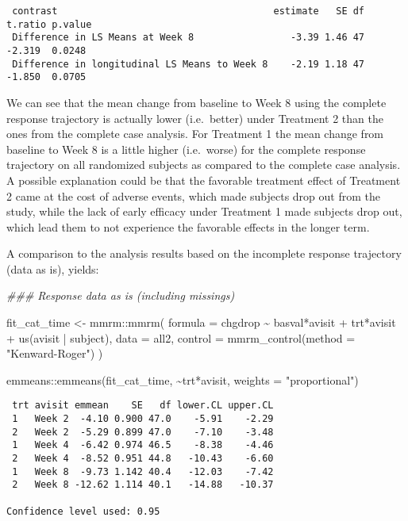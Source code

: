 \documentclass[
  letterpaper,
  DIV=11,
  numbers=noendperiod]{scrreprt}
\newenvironment{Shaded}{\begin{snugshade}}{\end{snugshade}}
\newcommand{\AttributeTok}[1]{\textcolor[rgb]{0.40,0.45,0.13}{#1}}
\newcommand{\DocumentationTok}[1]{\textcolor[rgb]{0.37,0.37,0.37}{\textit{#1}}}
\newcommand{\FunctionTok}[1]{\textcolor[rgb]{0.28,0.35,0.67}{#1}}
\newcommand{\NormalTok}[1]{\textcolor[rgb]{0.00,0.23,0.31}{#1}}
\newcommand{\OtherTok}[1]{\textcolor[rgb]{0.00,0.23,0.31}{#1}}
\newcommand{\SpecialCharTok}[1]{\textcolor[rgb]{0.37,0.37,0.37}{#1}}
\newcommand{\StringTok}[1]{\textcolor[rgb]{0.13,0.47,0.30}{#1}}
\begin{document}
\begin{verbatim}
 contrast                                      estimate   SE df t.ratio p.value
 Difference in LS Means at Week 8                 -3.39 1.46 47  -2.319  0.0248
 Difference in longitudinal LS Means to Week 8    -2.19 1.18 47  -1.850  0.0705
\end{verbatim}

We can see that the mean change from baseline to Week 8 using the
complete response trajectory is actually lower (i.e.~better) under
Treatment 2 than the ones from the complete case analysis. For Treatment
1 the mean change from baseline to Week 8 is a little higher
(i.e.~worse) for the complete response trajectory on all randomized
subjects as compared to the complete case analysis. A possible
explanation could be that the favorable treatment effect of Treatment 2
came at the cost of adverse events, which made subjects drop out from
the study, while the lack of early efficacy under Treatment 1 made
subjects drop out, which lead them to not experience the favorable
effects in the longer term.

A comparison to the analysis results based on the incomplete response
trajectory (data as is), yields:

\begin{Shaded}
\begin{Highlighting}[]
\DocumentationTok{\#\#\# Response data as is (including missings)}

\NormalTok{fit\_cat\_time }\OtherTok{\textless{}{-}}\NormalTok{ mmrm}\SpecialCharTok{::}\FunctionTok{mmrm}\NormalTok{(}
  \AttributeTok{formula =}\NormalTok{ chgdrop }\SpecialCharTok{\textasciitilde{}}\NormalTok{ basval}\SpecialCharTok{*}\NormalTok{avisit }\SpecialCharTok{+}\NormalTok{ trt}\SpecialCharTok{*}\NormalTok{avisit }\SpecialCharTok{+} \FunctionTok{us}\NormalTok{(avisit }\SpecialCharTok{|}\NormalTok{ subject),}
  \AttributeTok{data =}\NormalTok{ all2,}
  \AttributeTok{control =} \FunctionTok{mmrm\_control}\NormalTok{(}\AttributeTok{method =} \StringTok{"Kenward{-}Roger"}\NormalTok{)}
\NormalTok{)}

\NormalTok{emmeans}\SpecialCharTok{::}\FunctionTok{emmeans}\NormalTok{(fit\_cat\_time, }\SpecialCharTok{\textasciitilde{}}\NormalTok{trt}\SpecialCharTok{*}\NormalTok{avisit, }\AttributeTok{weights =} \StringTok{"proportional"}\NormalTok{)}
\end{Highlighting}
\end{Shaded}

\begin{verbatim}
 trt avisit emmean    SE   df lower.CL upper.CL
 1   Week 2  -4.10 0.900 47.0    -5.91    -2.29
 2   Week 2  -5.29 0.899 47.0    -7.10    -3.48
 1   Week 4  -6.42 0.974 46.5    -8.38    -4.46
 2   Week 4  -8.52 0.951 44.8   -10.43    -6.60
 1   Week 8  -9.73 1.142 40.4   -12.03    -7.42
 2   Week 8 -12.62 1.114 40.1   -14.88   -10.37

Confidence level used: 0.95 
\end{verbatim}
\end{document}
